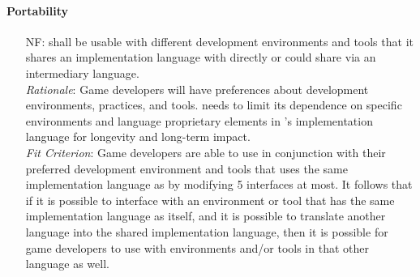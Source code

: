 \paragraph{Portability}
\noindent \begin{itemize}[wide=0pt, leftmargin=*]

    \item[NF\refstepcounter{nfnum}\thenfnum \label{N_Env}:] \progname{} shall
    be usable with different development environments and tools that it shares
    an implementation language with directly or could share via an intermediary
    language. \vspace*{1mm}\\
    \textit{Rationale}: Game developers will have preferences about development
    environments, practices, and tools. \progname{} needs to limit its
    dependence on specific environments and language proprietary elements in
    \progname{}'s implementation language for longevity and long-term impact.
    \vspace*{1mm}\\
    \textit{Fit Criterion}: Game developers are able to use \progname{} in
    conjunction with their preferred development environment and tools that
    uses the same implementation language as \progname{} by modifying 5
    interfaces at most. It follows that if it is possible to interface
    \progname{} with an environment or tool that has the same implementation
    language as itself, and it is possible to translate another language into
    the shared implementation language, then it is possible for game developers
    to use \progname{} with environments and/or tools in that other language as
    well.

\end{itemize}


